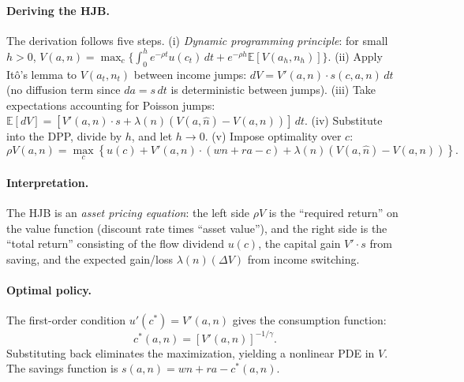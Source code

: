 \documentclass[11pt,a4paper]{report}
\newcommand{\E}[1]{\mathbb{E}\!\left[#1\right]}
\begin{document}
\paragraph{Deriving the HJB.}  The derivation follows five steps.  (i) \emph{Dynamic programming principle}: for small $h > 0$, $V(a,n) = \max_c\{\int_0^h e^{-\rho t}u(c_t)\,dt + e^{-\rho h}\E{V(a_h, n_h)}\}$.  (ii) Apply It\^o's lemma to $V(a_t, n_t)$ between income jumps: $dV = V'(a,n)\cdot s(c,a,n)\,dt$ (no diffusion term since $da = s\,dt$ is deterministic between jumps).  (iii) Take expectations accounting for Poisson jumps: $\E{dV} = [V'(a,n)\cdot s + \lambda(n)(V(a,\hat{n}) - V(a,n))]\,dt$.  (iv) Substitute into the DPP, divide by $h$, and let $h \to 0$.  (v) Impose optimality over $c$:
\begin{equation}
\boxed{\rho V(a,n) = \max_c\left\{u(c) + V'(a,n)\cdot(wn + ra - c) + \lambda(n)\!\left(V(a,\hat{n}) - V(a,n)\right)\right\}.}
\label{eq:hjb_full}
\end{equation}

\paragraph{Interpretation.}  The HJB is an \emph{asset pricing equation}: the left side $\rho V$ is the ``required return'' on the value function (discount rate times ``asset value''), and the right side is the ``total return'' consisting of the flow dividend $u(c)$, the capital gain $V' \cdot s$ from saving, and the expected gain/loss $\lambda(n)(\Delta V)$ from income switching.

\paragraph{Optimal policy.}  The first-order condition $u'(c^*) = V'(a,n)$ gives the consumption function:
\begin{equation}
c^*(a,n) = \left[V'(a,n)\right]^{-1/\gamma}.
\label{eq:hjb_foc}
\end{equation}
Substituting back eliminates the maximization, yielding a nonlinear PDE in $V$.  The savings function is $s(a,n) = wn + ra - c^*(a,n)$.
\end{document}
